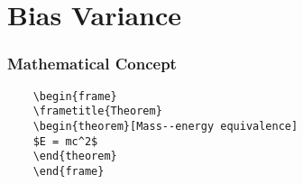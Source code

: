 \section{Bias Variance}

\begin{frame}[fragile] %
    \frametitle{Mathematical Concept}
    \begin{example}
    \begin{verbatim}
    \begin{frame}
    \frametitle{Theorem}
    \begin{theorem}[Mass--energy equivalence]
    $E = mc^2$
    \end{theorem}
    \end{frame}\end{verbatim}
    \end{example}
\end{frame}